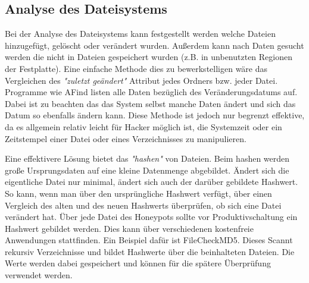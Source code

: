 \subsection{Analyse des Dateisystems}
Bei der Analyse des Dateisystems kann festgestellt werden welche Dateien hinzugefügt, gelöscht oder verändert wurden. Außerdem kann nach Daten gesucht werden die nicht in Dateien gespeichert wurden (z.B. in unbenutzten Regionen der Festplatte). Eine einfache Methode dies zu bewerkstelligen wäre das Vergleichen des \emph{"zuletzt geändert"} Attribut jedes Ordners bzw. jeder Datei. Programme wie AFind listen alle Daten bezüglich des Veränderungsdatums auf. Dabei ist zu beachten das das System selbst manche Daten ändert und sich das Datum so ebenfalls ändern kann. Diese Methode ist jedoch nur begrenzt effektive, da es allgemein relativ leicht für Hacker möglich ist, die Systemzeit oder ein Zeitstempel einer Datei oder eines Verzeichnisses zu manipulieren. 

Eine effektivere Lösung bietet das \emph{"hashen"} von Dateien. Beim hashen werden große Ursprungsdaten auf eine kleine Datenmenge abgebildet. Ändert sich die eigentliche Datei nur minimal, ändert sich auch der darüber gebildete Hashwert. So kann, wenn man über den ursprüngliche Hashwert verfügt, über einen Vergleich des alten und des neuen Hashwerts überprüfen, ob sich eine Datei verändert hat. 
Über jede Datei des Honeypots sollte vor Produktivschaltung ein Hashwert gebildet werden. Dies kann über verschiedenen kostenfreie Anwendungen stattfinden. Ein Beispiel dafür ist FileCheckMD5. Dieses Scannt rekursiv Verzeichnisse und bildet Hashwerte über die beinhalteten Dateien. Die Werte werden dabei gespeichert und können für die spätere Überprüfung verwendet werden.
